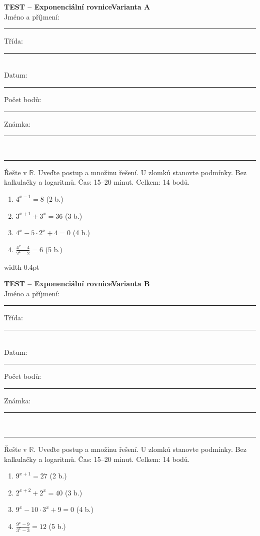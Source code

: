 \documentclass[a4paper,10pt,landscape]{article}
\newcommand{\TestTitle}{Exponenciální rovnice}
\newcommand{\TestHeader}[1]{%
    {\bfseries TEST -- \TestTitle}\hfill{\bfseries Varianta #1}\\[2mm]
    Jméno a příjmení: \rule{4.5cm}{0.4pt}\hfill Třída: \rule{1.5cm}{0.4pt}\\[2mm]
    Datum: \rule{2.4cm}{0.4pt}\hfill Počet bodů: \rule{1.4cm}{0.4pt}\hfill Známka: \rule{1.4cm}{0.4pt}\\[1mm]
    \hrule\vspace{3mm}
}
\newcommand{\AnswerSpace}[1]{\vspace{#1}}
\begin{document}
\noindent
\begin{minipage}[t]{0.48\textwidth}
    \small
    \TestHeader{A}

    Řešte v $\mathbb{R}$. Uveďte postup a množinu řešení.
    U zlomků stanovte podmínky. Bez kalkulačky a logaritmů.
    Čas: 15--20 minut. Celkem: 14 bodů.
    \begin{enumerate}
        \item $\displaystyle 4^{x-1}=8$ \hfill (2 b.)
        \AnswerSpace{18mm}
        \item $\displaystyle 3^{x+1}+3^x=36$ \hfill (3 b.)
        \AnswerSpace{23mm}
        \item $\displaystyle 4^x-5\cdot2^x+4=0$ \hfill (4 b.)
        \AnswerSpace{30mm}
        \item $\displaystyle \frac{4^x-4}{2^x-2}=6$ \hfill (5 b.)
        \AnswerSpace{30mm}
    \end{enumerate}
\end{minipage}%
\hfill\vrule width 0.4pt\hfill
\begin{minipage}[t]{0.48\textwidth}
    \small
    \TestHeader{B}

    Řešte v $\mathbb{R}$. Uveďte postup a množinu řešení.
    U zlomků stanovte podmínky. Bez kalkulačky a logaritmů.
    Čas: 15--20 minut. Celkem: 14 bodů.
    \begin{enumerate}
        \item $\displaystyle 9^{x+1}=27$ \hfill (2 b.)
        \AnswerSpace{18mm}
        \item $\displaystyle 2^{x+2}+2^x=40$ \hfill (3 b.)
        \AnswerSpace{23mm}
        \item $\displaystyle 9^x-10\cdot3^x+9=0$ \hfill (4 b.)
        \AnswerSpace{30mm}
        \item $\displaystyle \frac{9^x-9}{3^x-3}=12$ \hfill (5 b.)
        \AnswerSpace{30mm}
    \end{enumerate}
\end{minipage}
\end{document}
